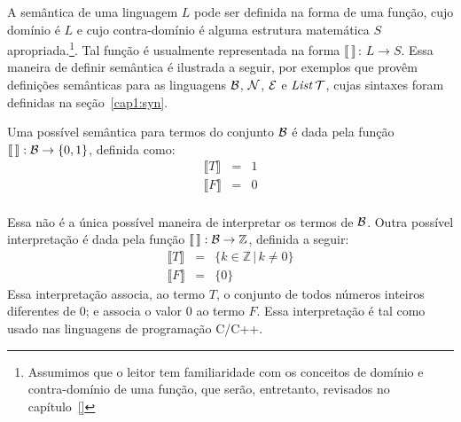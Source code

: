 A sem\^antica de uma linguagem $L$ pode ser definida na forma de uma função, cujo domínio é $L$ e cujo contra-domínio é alguma estrutura matemática $S$ apropriada.\footnote{Assumimos que o leitor tem familiaridade com os conceitos de dom\'inio e contra-dom\'inio de uma função, que serão, entretanto, revisados no cap\'itulo~\ref{}}.  Tal função é usualmente representada na forma $\llbracket\,\rrbracket\,:\,L \rightarrow S$. Essa maneira de definir semântica é ilustrada a seguir, por exemplos que provêm definições semânticas para as linguagens $\mathcal{B}$, $\mathcal{N}$, $\mathcal{E}$ e $\textit{List\/}\,\mathcal{T}$, cujas sintaxes foram definidas na se\c{c}\~ao~\ref{cap1:syn}.

\begin{Definition}
Uma poss\'ivel sem\^antica para termos do conjunto $\mathcal{B}$ \'e dada pela fun\c{c}\~ao $\llbracket\,\rrbracket : \mathcal{B} \rightarrow \{0,1\}$, definida como:
\[
\begin{array}{lcl}
\llbracket T \rrbracket & = & 1\\
\llbracket F \rrbracket & = & 0\\
\end{array}
\]
\end{Definition}
Essa não é a \'unica poss\'ivel maneira de interpretar os termos de $\mathcal{B}$. 
Outra poss\'ivel interpretação é dada pela função $\llbracket\,\rrbracket : \mathcal{B} \rightarrow \mathbb{Z}$, definida a seguir:
\[
\begin{array}{lcl}
\llbracket T \rrbracket & = & \{k\in\mathbb{Z}\,|\,k\neq 0\}\\
\llbracket F \rrbracket & = & \{0\}
\end{array}
\]
Essa interpretação associa, ao termo $T$, o conjunto de todos números inteiros diferentes de $0$; e associa o valor $0$ ao termo $F$. Essa interpretação é tal como usado nas linguagens de programa\c{c}\~ao C/C++.


